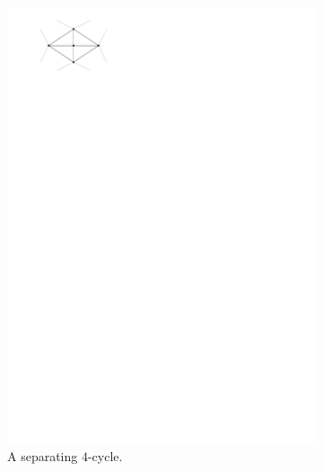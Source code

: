 \begin{figure}
\begin{subfigure}[t]{2cm}
          \includegraphics[width = \textwidth]{introduction/img/sep4cycle.pdf}
          \caption{A separating $4$-cycle.}
      \end{subfigure}
      ~
      \begin{subfigure}[t]{2cm}

\end{subfigure}
\end{figure}
